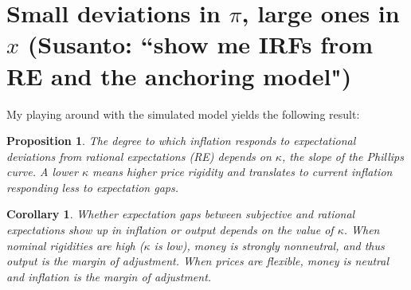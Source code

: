 \documentclass[11pt]{article}
\renewcommand{\[}{\begin{equation}}
\renewcommand{\]}{\end{equation}}
\newtheorem{prop}{Proposition}
\newtheorem{corollary}{Corollary}
\begin{document}
\section{Small deviations in $\pi$, large ones in $x$ (Susanto: ``show me IRFs from RE and the anchoring model")}
My playing around with the simulated model yields the following result: 
	\begin{prop} The degree to which inflation responds to expectational deviations from rational expectations (RE) depends on $\kappa$, the slope of the Phillips curve. A lower $\kappa$ means higher price rigidity and translates to current inflation responding less to expectation gaps.
	\end{prop}
	\begin{corollary}Whether expectation gaps between subjective and rational expectations show up in inflation or output depends on the value of $\kappa$. When nominal rigidities are high ($\kappa$ is low), money is strongly nonneutral, and thus output is the margin of adjustment. When prices are flexible, money is neutral and inflation is the margin of adjustment. 
	\end{corollary}
	
\end{document}
